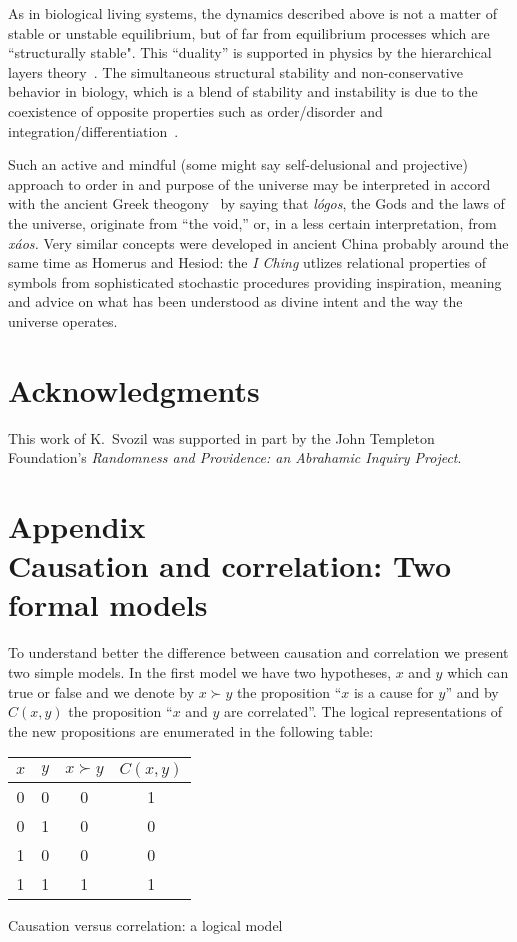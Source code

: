 \documentclass[12pt]{article}
\begin{document}
As in biological living systems, the dynamics  described above  is not a matter of stable or unstable equilibrium, but of far from equilibrium processes which  are ``structurally stable".
This ``duality'' is supported in physics by the  hierarchical layers theory~\cite{anderson:73, Pattee2012}. The simultaneous structural stability and non-conservative behavior   in biology,  which  is a blend of stability and instability is due to the coexistence of opposite properties such as
order/disorder and  integration/differentiation~\cite{rand_biol2013}.

Such an active and mindful (some might say self-delusional and projective) approach to order in and purpose of
the universe may  be interpreted in accord with the ancient Greek theogony~\cite{hesiod+700-2} by
saying that {\it l\'ogos}, the Gods and the laws  of the universe,
originate from ``the void,'' or, in a less certain interpretation, from {\it x\'aos.}
Very similar concepts were developed in ancient China probably around the same time as Homerus and Hesiod: the {\it I Ching} utlizes relational properties of symbols from sophisticated stochastic
procedures providing inspiration, meaning and advice on what has been understood as divine intent and the way the universe operates.
\medskip

\section{Acknowledgments}
This work of K.~Svozil was supported in part by the
John Templeton Foundation's {\em Randomness and Providence: an Abrahamic Inquiry Project}.

\bigskip



\appendix
\section*{Appendix\\ Causation and correlation:  Two formal models}
To understand better the difference between causation and correlation we present two simple models. In the first model we have two hypotheses,
$x$ and $y$ which can true or false and we denote by $x \succ y$ the proposition
``$x$ is a cause for $y$'' and by $C(x,y)$ the proposition ``$x$ and $y$ are correlated''.
The logical representations of the new propositions are enumerated in the following table:

\medskip

\begin{center}
	\begin{tabular}{|c|c|c|c|}
	\hline
  $x$ & $y$ & $x \succ y$ & $C(x,y)$  \\
  \hline
  0 & 0 & 0 & 1 \\
  \hline
  0&1 &0 &0 \\
  \hline
   1 &0 &0 & 0\\
  \hline
   1 &1 &1 & 1\\
  \hline
\end{tabular}
\bigskip

Causation versus correlation: a logical model
\end{center}
\end{document}
